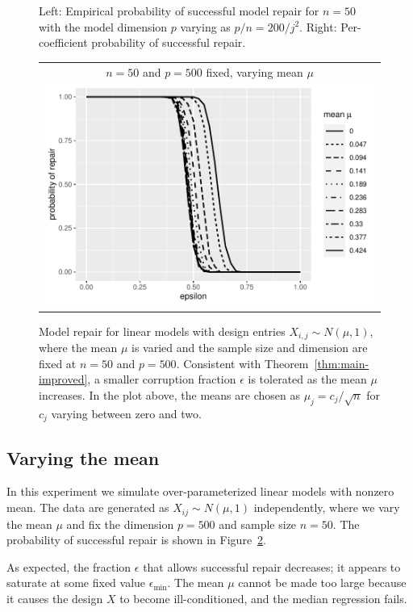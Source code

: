\begin{figure}[ht]
\begin{center}
\begin{tabular}{cc}
    \end{tabular}
  \end{center}
\caption{Left: Empirical probability of successful model repair for $n=50$ with the model dimension $p$
varying as $p/n = 200 /j^2$. Right: Per-coefficient probability of successful repair.}
\label{fig:exp1b}
\end{figure}


\begin{figure}[ht]
  \begin{center}
    \begin{tabular}{c}
      $n=50$ and $p=500$ fixed, varying mean $\mu$\\
      \includegraphics[width=.55\textwidth]{fig/plot-linear-mean-shift-50}
    \end{tabular}
  \end{center}
\caption{Model repair for linear models with design entries $X_{i,j}\sim N(\mu, 1)$,
where the mean $\mu$ is varied and the sample size and dimension are fixed at $n=50$ and $p=500$. Consistent with Theorem~\ref{thm:main-improved}, a smaller corruption fraction $\epsilon$ is tolerated as the mean $\mu$ increases. In the plot above, the means are chosen as $\mu_j = c_j/\sqrt{n}$ for $c_j$ varying between zero and two.}
\label{fig:mean}
\end{figure}

\subsection{Varying the mean}


In this experiment we simulate over-parameterized linear models
with nonzero mean. The data are generated as $X_{ij} \sim N(\mu,1)$
independently, where we vary the mean $\mu$ and fix the dimension $p=500$ and sample size $n=50$.
The probability of successful repair is shown in Figure~\ref{fig:mean}.


As expected, the fraction $\epsilon$ that allows successful repair decreases; it appears to saturate at some fixed value $\epsilon_{\min}$. The mean $\mu$ cannot be made too large because it causes the design $X$ to become ill-conditioned, and the median regression fails.

